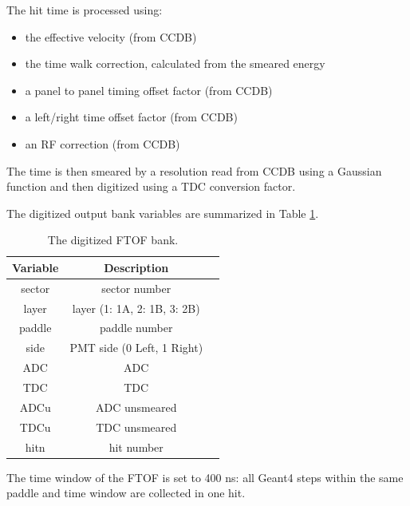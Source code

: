 The hit time is processed using:

\begin{itemize}
	\item the effective velocity (from CCDB)
	\item the time walk correction, calculated from the smeared energy
	\item a panel to panel timing offset factor (from CCDB)
	\item a left/right time offset factor (from CCDB)
	\item an RF correction (from CCDB)
\end{itemize}

The time is then smeared by a resolution read from CCDB using a Gaussian function and then digitized using a TDC conversion factor.

The digitized output bank variables are summarized in Table \ref{tab:ftofBank}.

\begin{table}[h]
	\begin{center}
		\begin{tabular}{| c | c | c |}
			\hline \hline
			Variable  & Description                                 \\
			\hline
              sector  &                             sector number   \\
               layer  &               layer (1: 1A, 2: 1B, 3: 2B)   \\
              paddle  &                             paddle number   \\
                side  &                PMT side (0 Left, 1 Right)   \\
                 ADC  &                                       ADC   \\
                 TDC  &                                       TDC   \\
                ADCu  &                             ADC unsmeared   \\
                TDCu  &                             TDC unsmeared   \\
                hitn  &                                hit number   \\
			\hline \hline
		\end{tabular}
	\end{center}
	\caption{The digitized FTOF bank.}\label{tab:ftofBank}
\end{table}


The time window  of the FTOF is set to 400 ns: all Geant4 steps within the same paddle and time window are collected in one hit.


